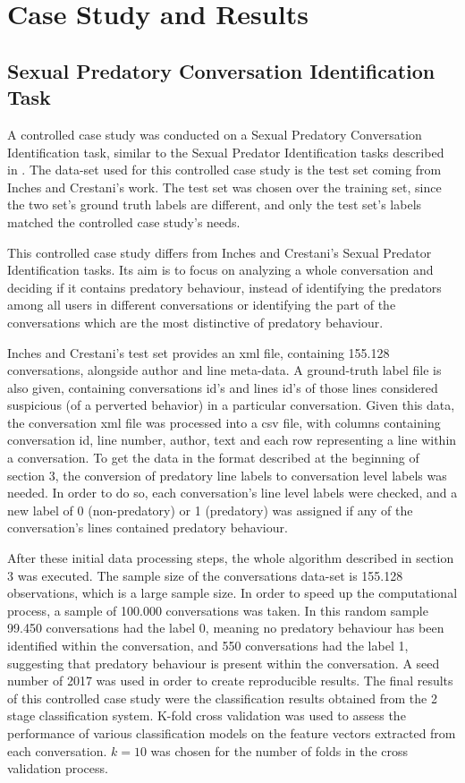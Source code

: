 \documentclass[11pt]{article}
\begin{document}
\section{Case Study and Results}
\subsection{Sexual Predatory Conversation Identification Task}
A controlled case study was conducted on a Sexual Predatory Conversation Identification task, similar to the Sexual Predator Identification tasks described in \cite{inches2012overview}. The data-set used for this controlled case study is the test set coming from Inches and Crestani's  work. The test set was chosen over the training set, since the two set's ground truth labels are different, and only the test set's labels matched the controlled case study's needs.

This controlled case study differs from Inches and Crestani's Sexual Predator Identification tasks. Its aim is to focus on analyzing a whole conversation and deciding if it contains predatory behaviour, instead of identifying the predators among all users in different conversations or identifying the part of the conversations which are the most distinctive of predatory behaviour. 

Inches and Crestani's test set provides an xml file, containing 155.128 conversations, alongside author and line meta-data. A ground-truth label file is also given, containing conversations id's and lines id's of those lines considered suspicious (of a perverted behavior) in a particular conversation. Given this data, the conversation xml file was processed into a csv file, with columns containing conversation id, line number, author, text and each row representing a line within a conversation. To get the data in the format described at the beginning of section 3, the conversion of predatory line labels to conversation level labels was needed. In order to do so, each conversation's line level labels were checked, and a new label of 0 (non-predatory) or 1 (predatory) was assigned if any of the conversation's lines contained predatory behaviour.

After these initial data processing steps, the whole algorithm described in section 3 was executed. The sample size of the conversations data-set is 155.128 observations, which is a large sample size. In order to speed up the computational process, a sample of 100.000 conversations was taken. In this random sample 99.450 conversations had the label 0, meaning no predatory behaviour has been identified within the conversation, and 550 conversations had the label 1, suggesting that predatory behaviour is present within the conversation. A seed number of 2017 was used in order to create reproducible results. The final results of this controlled case study were the classification results obtained from the 2 stage classification system. K-fold cross validation was used to assess the performance of various classification models on the feature vectors extracted from each conversation. $k=10$ was chosen for the number of folds in the cross validation process.
\end{document}
